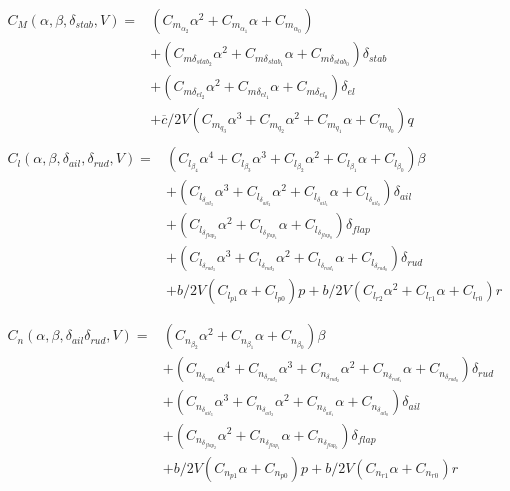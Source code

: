 \begin{equation}
\begin{split}
&\begin{split}
C_{M}(\alpha,\beta,\delta_{stab},V)=&(C_{m_{\alpha_{2}}}\alpha^{2}+C_{m_{\alpha_{1}}}\alpha +C_{m_{\alpha_{0}}})\\
&+(C_{m\delta_{stab_{2}}}\alpha^{2}+C_{m\delta_{stab_{1}}}\alpha +C_{m\delta_{stab_{0}}})\delta_{stab}\\
&+(C_{m\delta_{el_{2}}}\alpha^{2}+C_{m\delta_{el_{1}}}\alpha +C_{m\delta_{el_{0}}})\delta_{el}\\
&+\overline{c}/2V(C_{m_{q_{3}}}\alpha^{3}+C_{m_{q_{2}}}\alpha^{2}+C_{m_{q_{1}}}\alpha +C_{m_{q_{0}}})q
\end{split} \\
&\begin{split}
C_{l}(\alpha , \beta , \delta _{ail},\delta _{rud},V)=&(C_{l_{\beta _{4}}}\alpha ^{4}+C_{l_{\beta _{3}}}\alpha^{3}+C_{l_{\beta _{2}}}\alpha ^{2}+
C_{l_{\beta _{1}}}\alpha + C_{l_{\beta _{0}}})\beta \\
& +(C_{l_{\delta _{ail_{3}}}}\alpha ^{3}+C_{l_{\delta _{ail_{2}}}}\alpha ^{2}+
C_{l_{\delta _{ail_{1}}}}\alpha + C_{l_{\delta _{ail_{0}}}})\delta _{ail}\\
& +(C_{l_{\delta _{flap_{2}}}}\alpha ^{2}+
C_{l_{\delta _{flap_{1}}}}\alpha + C_{l_{\delta _{flap_{0}}}})\delta _{flap}\\
&+(C_{l_{\delta _{rud_{3}}}}\alpha ^{3}+C_{l_{\delta _{rud_{2}}}}\alpha ^{2}+
C_{l_{\delta _{rud_{1}}}}\alpha + C_{l_{\delta _{rud_{0}}}})\delta _{rud}\\
&+ b/2V(C_{l_{p1}}\alpha +C_{l_{p0}})p+b/2V(C_{l_{r2}}\alpha ^{2}+C_{l_{r1}}\alpha +C_{l_{r0}})r\\
\end{split} \\
&\begin{split}
C_{n}(\alpha,\beta,\delta_{ail}\delta_{rud},V)=&(C_{n_{\beta_{2}}}\alpha^{2}+C_{n_{\beta_{1}}}\alpha
+C_{n_{\beta_{0}}})\beta \\
&+ (C_{n_{\delta_{rud_{4}}}}\alpha^{4}
+C_{n_{\delta_{rud_{3}}}}\alpha^{3}+C_{n_{\delta_{rud_{2}}}}\alpha^{2}+
C_{n_{\delta_{rud_{1}}}}\alpha+C_{n_{\delta_{rud_{0}}}})\delta_{rud} \\
& +(C_{n_{\delta_{ail_{3}}}}\alpha^{3}+C_{n_{\delta_{ail_{2}}}}\alpha^{2}+
C_{n_{\delta_{ail_{1}}}}\alpha+C_{n_{\delta_{ail_{0}}}})\delta_{ail}\\
& +(C_{n_{\delta_{flap_{2}}}}\alpha^{2}+
C_{n_{\delta_{flap_{1}}}}\alpha+C_{n_{\delta_{flap_{0}}}})\delta_{flap}\\
&+ b/2V(C_{n_{p1}}\alpha +C_{n_{p0}})p+b/2V(C_{n_{r1}}\alpha +C_{n_{r0}})r\\
\end{split}
\end{split}
\end{equation}

